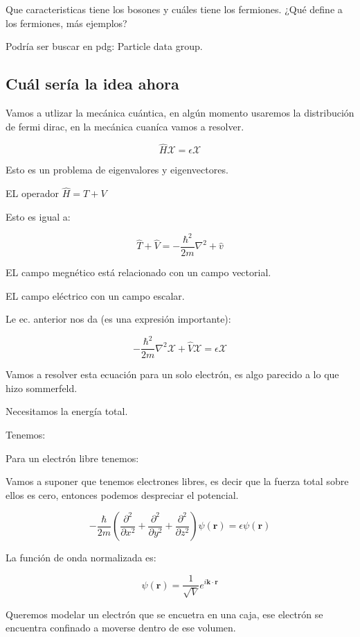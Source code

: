 \documentclass{article}
\begin{document}
Que caracteristicas tiene los bosones y cuáles tiene los fermiones. ¿Qué define a los fermiones, más ejemplos?

Podría ser buscar en pdg: Particle data group. 

\subsection{Cuál sería la idea ahora}


Vamos a utlizar la mecánica cuántica, en algún momento usaremos la distribución de fermi dirac, en la mecánica cuaníca vamos a resolver.


\[  \hat{H} \mathcal{X} = \epsilon \mathcal{X}  \]


Esto es un problema de eigenvalores y eigenvectores. 


EL operador $\hat{H} = T+V$


Esto es igual a:

\[ \hat{T} + \hat{V} = - \frac{\hbar^{2}}{2m} \nabla^{2} + \hat{v}  \]

EL campo megnético está relacionado con un campo vectorial.

EL campo eléctrico con un campo escalar.

Le ec. anterior nos da (es una expresión importante):



\[ - \frac{\hbar^{2}}{2m} \nabla^{2} \mathcal{X} + \hat{V}\mathcal{X} = \epsilon{\mathcal{X}}  \]


Vamos a resolver esta ecuación para un solo electrón, es algo parecido a lo que hizo sommerfeld.

Necesitamos la energía total.

Tenemos:


Para un electrón libre tenemos:

Vamos a suponer que tenemos electrones libres, es decir que la fuerza total sobre ellos es cero, entonces podemos despreciar el potencial. 

 \[ - \frac{\hbar}{2m} \left( \frac{ \partial^{2} }{\partial x^{2}} + \frac{ \partial^{2} }{\partial y^{2}} + \frac{\partial^{2}}{\partial z^{2}} \right) \psi(\boldsymbol{r}) = \epsilon \psi(\boldsymbol{r})    \]


La función de onda normalizada es:


\[ \psi(\boldsymbol{r}) = \frac{1}{ \sqrt{V} } e^{i\boldsymbol{k}\cdot \boldsymbol{r}} \]

Queremos modelar un electrón que se encuetra en una caja, ese electrón se encuentra confinado a moverse dentro de ese volumen. 
\end{document}
